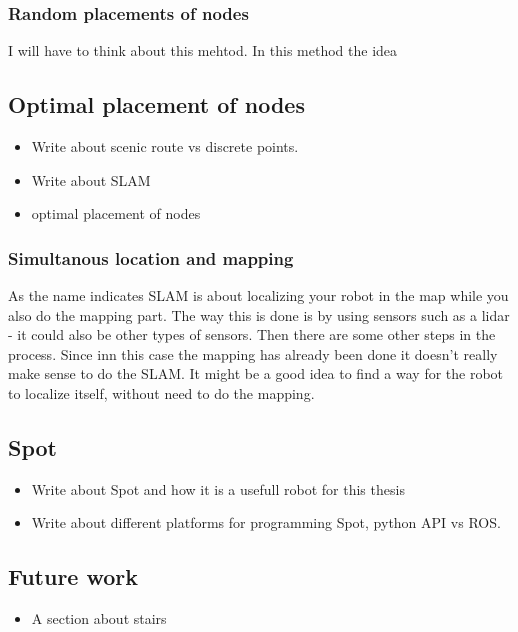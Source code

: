 \subsubsection{Random placements of nodes}
I will have to think about this mehtod.
In this method the idea
























\subsection{Optimal placement of nodes}
\begin{itemize}
    \item Write about scenic route vs discrete points.
    \item Write about SLAM
    \item optimal placement of nodes
\end{itemize}

\subsubsection{Simultanous location and mapping}
As the name indicates SLAM is about localizing your robot in the map while you also do the mapping part. The way this is done is by using sensors such as a lidar - it could also be other types of sensors. Then there are some other steps in the process. Since inn this case the mapping has already been done it doesn't really make sense to do the SLAM. It might be a good idea to find a way for the robot to localize itself, without need to do the mapping.



\subsection{Spot}
\begin{itemize}
    \item Write about Spot and how it is a usefull robot for this thesis
    \item Write about different platforms for programming Spot, python API vs ROS.
\end{itemize}

\subsection{Future work}
\begin{itemize}
    \item A section about stairs
\end{itemize}


